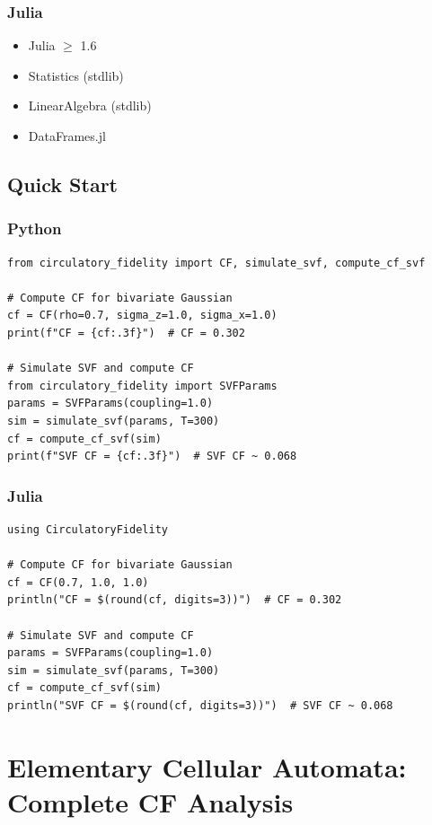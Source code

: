\documentclass[10pt]{article} %
\theoremstyle{plain}
\theoremstyle{definition}
\begin{document}
\subsubsection{Julia}
\begin{itemize}
\item Julia $\geq$ 1.6
\item Statistics (stdlib)
\item LinearAlgebra (stdlib)
\item DataFrames.jl
\end{itemize}

\subsection{Quick Start}

\subsubsection{Python}
\begin{lstlisting}
from circulatory_fidelity import CF, simulate_svf, compute_cf_svf

# Compute CF for bivariate Gaussian
cf = CF(rho=0.7, sigma_z=1.0, sigma_x=1.0)
print(f"CF = {cf:.3f}")  # CF = 0.302

# Simulate SVF and compute CF
from circulatory_fidelity import SVFParams
params = SVFParams(coupling=1.0)
sim = simulate_svf(params, T=300)
cf = compute_cf_svf(sim)
print(f"SVF CF = {cf:.3f}")  # SVF CF ~ 0.068
\end{lstlisting}

\subsubsection{Julia}
\begin{lstlisting}
using CirculatoryFidelity

# Compute CF for bivariate Gaussian
cf = CF(0.7, 1.0, 1.0)
println("CF = $(round(cf, digits=3))")  # CF = 0.302

# Simulate SVF and compute CF
params = SVFParams(coupling=1.0)
sim = simulate_svf(params, T=300)
cf = compute_cf_svf(sim)
println("SVF CF = $(round(cf, digits=3))")  # SVF CF ~ 0.068
\end{lstlisting}


\section{Elementary Cellular Automata: Complete CF Analysis}
\label{app:eca}
\end{document}
